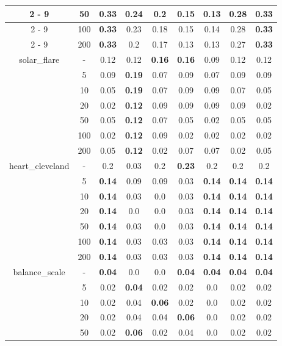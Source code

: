 \documentclass{article}%
\begin{document}
\begin{longtable}{c|c|ccccccc}
\cline{2%
-%
9}%
&50&\textbf{0.33}&0.24&0.2&0.15&0.13&0.28&\textbf{0.33}\\%
\cline{2%
-%
9}%
&100&\textbf{0.33}&0.23&0.18&0.15&0.14&0.28&\textbf{0.33}\\%
\cline{2%
-%
9}%
&200&\textbf{0.33}&0.2&0.17&0.13&0.13&0.27&\textbf{0.33}\\%
\hline%
\multirow{7}{*}{solar\_flare}&{-}&0.12&0.12&\textbf{0.16}&\textbf{0.16}&0.09&0.12&0.12\\%
\cline{2%
-%
9}%
&5&0.09&\textbf{0.19}&0.07&0.09&0.07&0.09&0.09\\%
\cline{2%
-%
9}%
&10&0.05&\textbf{0.19}&0.07&0.09&0.09&0.07&0.05\\%
\cline{2%
-%
9}%
&20&0.02&\textbf{0.12}&0.09&0.09&0.09&0.09&0.02\\%
\cline{2%
-%
9}%
&50&0.05&\textbf{0.12}&0.07&0.05&0.02&0.05&0.05\\%
\cline{2%
-%
9}%
&100&0.02&\textbf{0.12}&0.09&0.02&0.02&0.02&0.02\\%
\cline{2%
-%
9}%
&200&0.05&\textbf{0.12}&0.02&0.07&0.07&0.02&0.05\\%
\hline%
\multirow{7}{*}{heart\_cleveland}&{-}&0.2&0.03&0.2&\textbf{0.23}&0.2&0.2&0.2\\%
\cline{2%
-%
9}%
&5&\textbf{0.14}&0.09&0.09&0.03&\textbf{0.14}&\textbf{0.14}&\textbf{0.14}\\%
\cline{2%
-%
9}%
&10&\textbf{0.14}&0.03&0.0&0.03&\textbf{0.14}&\textbf{0.14}&\textbf{0.14}\\%
\cline{2%
-%
9}%
&20&\textbf{0.14}&0.0&0.0&0.03&\textbf{0.14}&\textbf{0.14}&\textbf{0.14}\\%
\cline{2%
-%
9}%
&50&\textbf{0.14}&0.03&0.0&0.03&\textbf{0.14}&\textbf{0.14}&\textbf{0.14}\\%
\cline{2%
-%
9}%
&100&\textbf{0.14}&0.03&0.03&0.03&\textbf{0.14}&\textbf{0.14}&\textbf{0.14}\\%
\cline{2%
-%
9}%
&200&\textbf{0.14}&0.03&0.03&0.03&\textbf{0.14}&\textbf{0.14}&\textbf{0.14}\\%
\hline%
\multirow{7}{*}{balance\_scale}&{-}&\textbf{0.04}&0.0&0.0&\textbf{0.04}&\textbf{0.04}&\textbf{0.04}&\textbf{0.04}\\%
\cline{2%
-%
9}%
&5&0.02&\textbf{0.04}&0.02&0.02&0.0&0.02&0.02\\%
\cline{2%
-%
9}%
&10&0.02&0.04&\textbf{0.06}&0.02&0.0&0.02&0.02\\%
\cline{2%
-%
9}%
&20&0.02&0.04&0.04&\textbf{0.06}&0.0&0.02&0.02\\%
\cline{2%
-%
9}%
&50&0.02&\textbf{0.06}&0.02&0.04&0.0&0.02&0.02\\%

\end{longtable}
\end{document}
